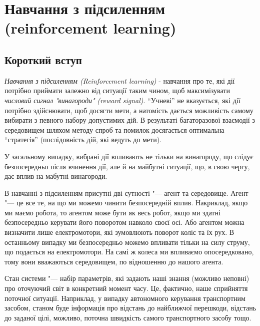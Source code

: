 \newpage
\section{Навчання з підсиленням (reinforcement learning)}

\subsection{Короткий вступ}

\emph{Навчання з підсиленням (Reinforcement learning)} - навчання про те, які дії потрібно приймати залежно від ситуації таким чином, щоб максимізувати \emph{числовий сигнал "винагороди" (reward signal)}. ``Учневі'' не вказується, які дії потрібно здійснювати, щоб досягти мети, а натомість дається можливість самому вибирати з певного набору допустимих дій. В результаті багаторазової взаємодії з середовищем шляхом методу спроб та помилок досягається оптимальна ``стратегія'' (послідовність дій, які ведуть до мети).

У загальному випадку, вибрані дії впливають не тільки на винагороду, що слідує безпосередньо після вчинення дії, але й на майбутні ситуації, що, в свою чергу, дає вплив на мабутні винагороди.

В навчанні з підсиленням присутні дві сутності "--- агент та середовище. Агент "--- це все те, на що ми можемо чинити безпосередній вплив.
Накриклад, якщо ми маємо робота, то агентом може бути як весь робот, якщо ми здатні безпосередньо керувати його поворотом навколо своєї осі. Або агентом можна визначити лише електромотори, які зумовлюють поворот коліс та їх рух. В останньому випадку ми безпосередньо можемо впливати тільки на силу струму, що подається на електромотори. На самі ж колеса ми впливаємо опосередковано, тому вони вважаються середовищем, по відношенню до нашого агента.

Стан системи "--- набір параметрів, які задають наші знання (можливо неповні) про оточуючий світ в конкретний момент часу. Це, фактично, наше сприйняття поточної ситуації. Наприклад, у випадку автономного керування транспортним засобом, станом буде інформація про
відстань до найближчої перешкоди, відстань до заданої цілі, можливо, поточна швидкість самого транспортного засобу тощо.

